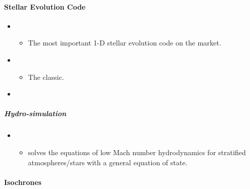 \documentclass[letterpaper,10pt,english]{sphinxmanual}
\begin{document}
\paragraph{Stellar Evolution Code}
\label{\detokenize{resource/astro/topics/stellar_and_spops:stellar-evolution-code}}\begin{itemize}
\item {} 
\begin{itemize}
\item {} 
The most important  1-D stellar evolution code on the
market.

\end{itemize}

\item {} 
\begin{itemize}
\item {} 
The classic.

\end{itemize}

\item {} 

\end{itemize}


\subparagraph{Hydro-simulation}
\label{\detokenize{resource/astro/topics/stellar_and_spops:hydro-simulation}}\begin{itemize}
\item {} 
\begin{itemize}
\item {} 
solves the equations of low Mach number hydrodynamics for
stratified atmospheres/stars with a general equation of state.

\end{itemize}

\end{itemize}


\paragraph{Isochrones}
\label{\detokenize{resource/astro/topics/stellar_and_spops:isochrones}}
\end{document}
